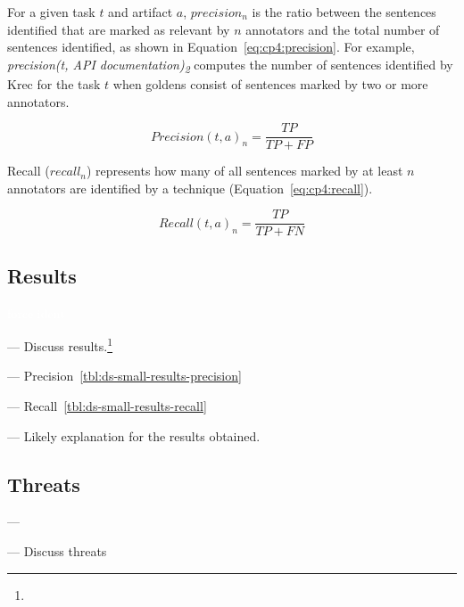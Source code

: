



For a given task $t$ and artifact $a$, $precision_n$ is the ratio between the sentences identified that are marked as relevant by $n$ annotators and the total number of sentences identified, as shown in Equation~\ref{eq:cp4:precision}. For example,  \textit{precision(t, API documentation)\textsubscript{2}} computes the number of sentences identified by \acs{Krec} for the task $t$ when 
goldens consist of sentences marked by two or more annotators.


\begin{equation}
\label{eq:cp4:precision}    
    Precision(t, a)_n = \frac{TP}{TP + FP}
\end{equation}


Recall ($recall_n$) represents how many of all sentences marked by at least $n$ annotators are identified by a technique (Equation~\ref{eq:cp4:recall}).



\begin{equation}
\label{eq:cp4:recall}        
    Recall(t, a)_n = \frac{TP}{TP + FN}
\end{equation}

\vspace{3mm}




\subsection{Results}
\textcolor{white}{force ident} %


--- Discuss results.\footnote{} \vspace{3mm}



--- Precision~\ref{tbl:ds-small-results-precision}  \vspace{3mm}


--- Recall~\ref{tbl:ds-small-results-recall} \vspace{3mm}

--- Likely explanation for the results obtained.










\subsection{Threats}
\label{cp4:corpus-threats}

---  \vspace{3mm}

--- Discuss threats \vspace{3mm}



